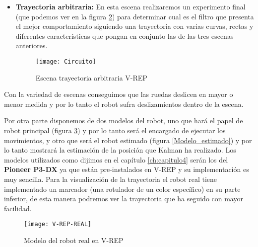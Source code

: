 \begin{itemize}
Podemos ver la trayectoria senoidal en la figura \ref{Escena-seno}.
Los porcentajes de deslizamiento son los mismos que para las dos escenas anteriores.
\begin{figure}[ht!]
\centering
\texttt{[image: V-REP-SENO]}
\caption{Escena trayectoria senoidal V-REP} \label{Escena-seno}
\end{figure}
\item \textbf{Trayectoria arbitraria:} En esta escena realizaremos un experimento final (que podemos ver en la figura \ref{Escena-circuito}) para determinar cual es el filtro que presenta el mejor comportamiento siguiendo una trayectoria con varias curvas, rectas y diferentes características que pongan en conjunto las de las tres escenas anteriores.
\begin{figure}[ht!]
\centering
\texttt{[image: Circuito]}
\caption{Escena trayectoria arbitraria V-REP} \label{Escena-circuito}
\end{figure}
\end{itemize}

%
%
%
%
%
%
Con la variedad de escenas conseguimos que las ruedas deslicen en mayor o menor medida y por lo tanto el robot sufra deslizamientos dentro de la escena.

Por otra parte disponemos de dos modelos del robot, uno que hará el papel de robot principal (figura \ref{Modelo_real}) y por lo tanto será el encargado de ejecutar los movimientos, y otro que será el robot estimado (figura \ref{Modelo_estimado}) y por lo tanto mostrará la estimación de la posición que Kalman ha realizado.
Los modelos utilizados como dijimos en el capítulo \ref{ch:capitulo4} serán los del \textbf{Pioneer P3-DX} ya que están pre-instalados en V-REP y su implementación es muy sencilla. 
Para la visualización de la trayectoria el robot real tiene implementado un marcador (una rotulador de un color específico) en su parte inferior, de esta manera podremos ver la trayectoria que ha seguido con mayor facilidad.
\begin{figure}[ht!]
\centering
\texttt{[image: V-REP-REAL]}
\caption{Modelo del robot real en V-REP} \label{Modelo_real}
\end{figure}

